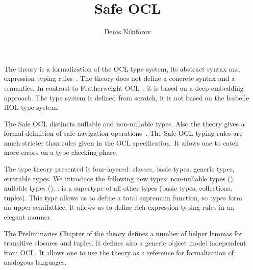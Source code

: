 \documentclass[11pt,a4paper]{book}
\makeatletter
\newenvironment{abstract}{%
  \small
  \begin{center}%
    {\bfseries \abstractname\vspace{-.5em}\vspace{\z@}}%
  \end{center}%
  \quotation}{\endquotation}
\makeatother
\begin{document}
\title{Safe OCL}
\author{Denis Nikiforov}
\maketitle

\begin{abstract}
  The theory is a formalization of the OCL type system,
  its abstract syntax and expression typing rules~\cite{OCL24}.
  The theory does not define a concrete syntax and a semantics.
  In contrast to Featherweight OCL~\cite{Featherweight_OCL-AFP},
  it is based on a deep embedding approach. The type system is defined
  from scratch, it is not based on the Isabelle HOL type system.

  The Safe OCL distincts nullable and non-nullable types. Also
  the theory gives a formal definition of safe navigation
  operations~\cite{DBLP:conf/models/Willink15}. The Safe OCL typing rules
  are much stricter than rules given in the OCL specification.
  It allows one to catch more errors on a type checking phase.

  The type theory presented is four-layered: classes, basic types,
  generic types, errorable types. We introduce the following new types:
  non-nullable types (),
  nullable types (\isa{{\isasymtau}{\isacharbrackleft}{\isacharquery}{\isacharbrackright}}),
  .  is a supertype of all other types
  (basic types, collections, tuples). This type allows us to define
  a total supremum function, so types form an upper semilattice.
  It allows us to define rich expression typing rules in an elegant manner.

  The Preliminaries Chapter of the theory defines a number of
  helper lemmas for transitive closures and tuples. It defines also
  a generic object model independent from OCL. It allows one to use
  the theory as a reference for formalization of analogous languages.
\end{abstract}

\tableofcontents





\end{document}
